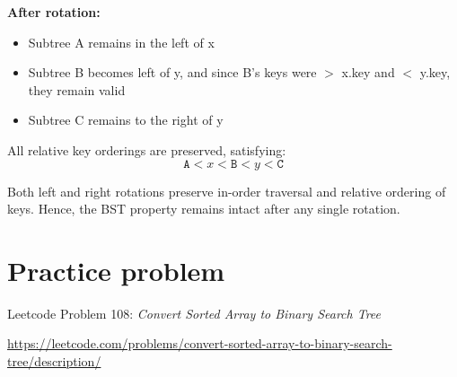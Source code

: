 \documentclass{article}
\begin{document}
\textbf{After rotation:}
\begin{itemize}
  \item Subtree A remains in the left of x
  \item Subtree B becomes left of y, and since B's keys were $>$ x.key and $<$ y.key, they remain valid
  \item Subtree C remains to the right of y
\end{itemize}

All relative key orderings are preserved, satisfying:
\[
\texttt{A} < x < \texttt{B} < y < \texttt{C}
\]


Both left and right rotations preserve in-order traversal and relative ordering of keys. Hence, the BST property remains intact after any single rotation.

\section{Practice problem}
Leetcode Problem 108: \textit{Convert Sorted Array to Binary Search Tree}

\url{https://leetcode.com/problems/convert-sorted-array-to-binary-search-tree/description/}
\end{document}
